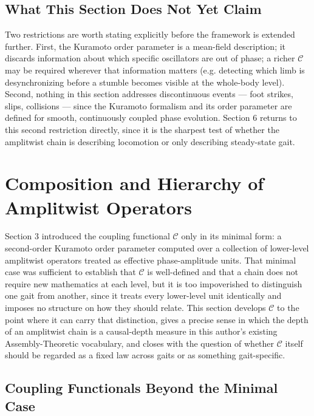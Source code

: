 \documentclass[12pt]{article}
\begin{document}
\subsection{What This Section Does Not Yet Claim}

Two restrictions are worth stating explicitly before the framework is extended further. First, the Kuramoto order parameter is a mean-field description; it discards information about which specific oscillators are out of phase; a richer $\mathcal{C}$ may be required wherever that information matters (e.g. detecting which limb is desynchronizing before a stumble becomes visible at the whole-body level). Second, nothing in this section addresses discontinuous events — foot strikes, slips, collisions — since the Kuramoto formalism and its order parameter are defined for smooth, continuously coupled phase evolution. Section 6 returns to this second restriction directly, since it is the sharpest test of whether the amplitwist chain is describing locomotion or only describing steady-state gait.

\section{Composition and Hierarchy of Amplitwist Operators}

Section 3 introduced the coupling functional $\mathcal{C}$ only in its minimal form: a second-order Kuramoto order parameter computed over a collection of lower-level amplitwist operators treated as effective phase-amplitude units. That minimal case was sufficient to establish that $\mathcal{C}$ is well-defined and that a chain does not require new mathematics at each level, but it is too impoverished to distinguish one gait from another, since it treats every lower-level unit identically and imposes no structure on how they should relate. This section develops $\mathcal{C}$ to the point where it can carry that distinction, gives a precise sense in which the depth of an amplitwist chain is a causal-depth measure in this author's existing Assembly-Theoretic vocabulary, and closes with the question of whether $\mathcal{C}$ itself should be regarded as a fixed law across gaits or as something gait-specific.

\subsection{Coupling Functionals Beyond the Minimal Case}
\end{document}
